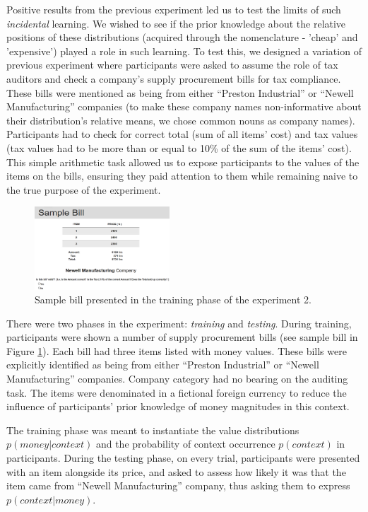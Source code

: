 \documentclass[10pt,letterpaper]{article}
\begin{document}
Positive results from the previous experiment led us to test the limits of such {\em incidental} learning. We wished to see if the prior knowledge about the relative positions of these distributions (acquired through the nomenclature - 'cheap' and 'expensive') played a role in such learning. To test this, we designed a variation of previous experiment where participants were asked to assume the role of tax auditors and check a company's supply procurement bills for tax compliance. These bills were mentioned as being from either “Preston Industrial” or “Newell Manufacturing” companies (to make these company names non-informative about their distribution's relative means, we chose common nouns as company names). Participants had to check for correct total (sum of all items' cost) and tax values (tax values had to be more than or equal to 10\% of the sum of the items' cost). This simple arithmetic task allowed us to expose participants to the values of the items on the bills, ensuring they paid attention to them while remaining naive to the true purpose of the experiment. 
	
\begin{figure}[htbp]
	\centering
	\includegraphics[width=0.45\textwidth]{results/Sample_bill_newell.png}
	\caption{Sample bill presented in the training phase of the experiment 2.}
	\label{fig:design2}
\end{figure}

There were two phases in the experiment: {\em training} and {\em testing}. During training, participants were shown a number of supply procurement bills (see sample bill in Figure \ref{fig:design2}). Each bill had three items listed with money values. These bills were explicitly identified as being from either “Preston Industrial” or “Newell Manufacturing” companies. Company category had no bearing on the auditing task. The items were denominated in a fictional foreign currency to reduce the influence of participants' prior knowledge of money magnitudes in this context. 

The training phase was meant to instantiate the value distributions $p(money|context)$ and the probability of context occurrence $p(context)$ in participants. During the testing phase, on every trial, participants were presented with an item alongside its price, and asked to assess how likely it was that the item came from “Newell Manufacturing” company, thus asking them to express $p(context|money)$.
\end{document}
